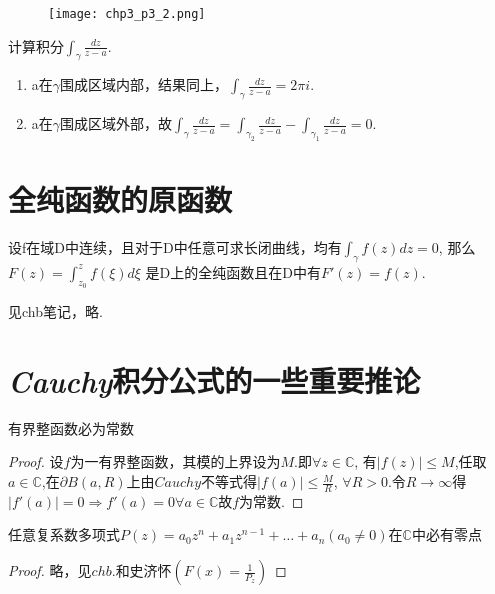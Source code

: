 \begin{figure}[h]
	\centering
	\texttt{[image: chp3\_p3\_2.png]}
\end{figure}

\begin{eg}
	计算积分$\int_\gamma \frac{dz}{z - a}$.
\end{eg}
\begin{jie}
	\begin{enumerate}[(1)]
		\item a在$\gamma$围成区域内部，结果同上，$\int_\gamma \frac{dz}{z-a} = 2\pi i$.
		\item a在$\gamma$围成区域外部，故$\int_\gamma \frac{dz}{z-a} = \int_{\gamma_2} \frac{dz}{z -a} - \int_{\gamma_1} \frac{dz}{z-a} = 0$.
	\end{enumerate}
\end{jie}


\section{全纯函数的原函数}
\begin{mypro}
	设f在域D中连续，且对于D中任意可求长闭曲线，均有$\int_\gamma f(z) dz = 0$, 那么$F(z) = \int_{z_0}^{z} f(\xi) d\xi$ 是D上的全纯函数且在D中有$F'(z) = f(z)$.
\end{mypro}
\begin{mypro}
	见chb笔记，略.
\end{mypro}

\section{\emph{Cauchy}积分公式的一些重要推论}

\begin{mypro}[Liouville定理]
	有界整函数必为常数
\end{mypro}
\begin{proof}
	设$f$为一有界整函数，其模的上界设为$M$.即$\forall z\in\mathbb{C}$,
	有$|f(z)|\leq M$,任取$a\in\mathbb{C}$,在$\partial$$B(a,R)$上由$Cauchy$不等式得$\displaystyle{|f(a)|\le\frac{M}{R}}$,
	$\forall R>0$.令$R\rightarrow\infty$得$|f'(a)|=0\Rightarrow f'(a)=0\forall a\in\mathbb{C}$故$f$为常数.
\end{proof}

\begin{mypro}[代数基本定理]
	任意复系数多项式$P(z)=a_{0}z^{n}+a_{1}z^{n-1}+\dots+a_{n}$\quad$(a_{0}\neq0)$在$\mathbb{C}$中必有零点
\end{mypro}
\begin{proof}
	略，见$chb.$和史济怀\quad$\displaystyle{(F(x)=\frac{1}{P_{z}})}$
\end{proof}

